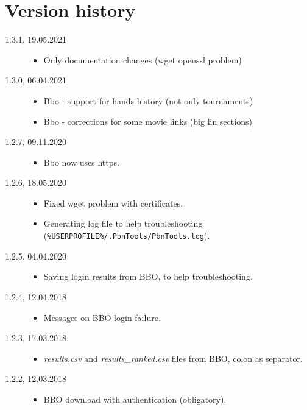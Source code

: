 \documentclass[polish,a4paper,11pt,oneside]{article}
\begin{document}
\section{Version history}
\begin{description}
\item[1.3.1, 19.05.2021]
  \begin{itemize}
  \item Only documentation changes (wget openssl problem)
  \end{itemize}
\item[1.3.0, 06.04.2021]
  \begin{itemize}
  \item Bbo - support for hands history (not only tournaments)
  \item Bbo - corrections for some movie links (big lin sections)
  \end{itemize}
\item[1.2.7, 09.11.2020]
  \begin{itemize}
  \item Bbo now uses https.
  \end{itemize}
\item[1.2.6, 18.05.2020]
  \begin{itemize}
  \item Fixed wget problem with certificates.
  \item Generating log file to help troubleshooting
        (\verb!%USERPROFILE%/.PbnTools/PbnTools.log!).
  \end{itemize}
\item[1.2.5, 04.04.2020]
  \begin{itemize}
  \item Saving login results from BBO, to help troubleshooting.
  \end{itemize}
\item[1.2.4, 12.04.2018]
  \begin{itemize}
  \item Messages on BBO login failure.
  \end{itemize}
\item[1.2.3, 17.03.2018]
  \begin{itemize}
  \item {\em results.csv} and {\em results\_ranked.csv} files from BBO,
        colon as separator.
  \end{itemize}
\item[1.2.2, 12.03.2018]
  \begin{itemize}
  \item BBO download with authentication (obligatory).

\end{itemize}
\end{description}
\end{document}
